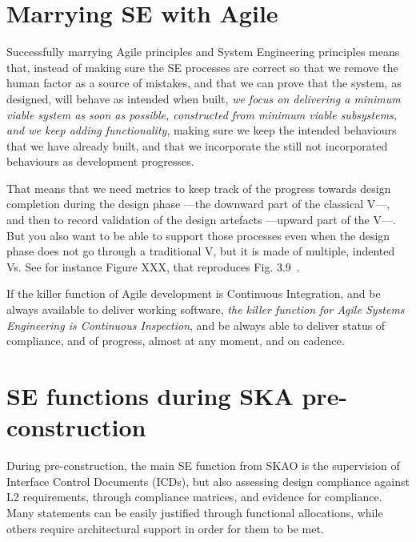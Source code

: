 \documentclass[11pt,twoside]{article}
\begin{document}

\section{Marrying SE with Agile} %
\label{sec:se_and_agile}
Successfully marrying Agile principles and System Engineering principles means that, instead of making sure the SE processes are correct so that we remove the human factor as a source of mistakes, and that we can prove that the system, as designed, will behave as intended when built, \emph{we focus on delivering a minimum viable system as soon as possible, constructed from minimum viable subsystems, and we keep adding functionality}, making sure we keep the intended behaviours that we have already built, and that we incorporate the still not incorporated behaviours as development progresses.	

That means that we need metrics to keep track of the progress towards design completion during the design phase ---the downward part of the classical V---, and then to record validation of the design artefacts ---upward part of the V---. But you also want to be able to support those processes even when the design phase does not go through a traditional V, but it is made of multiple, indented Vs. See for instance Figure XXX, that reproduces Fig. 3.9~\citep{INCOSE-TP-2003-002-04}.

If the killer function of Agile development is Continuous Integration, and be always available to deliver working software, \emph{the killer function for Agile Systems Engineering is Continuous Inspection}, and be always able to deliver status of compliance, and of progress, almost at any moment, and on cadence.	


\section{SE functions during SKA pre-construction} %
\label{sec:se_functions_during_ska_pre_construction}
During pre-construction, the main SE function from SKAO is the supervision of Interface Control Documents (ICDs), but also assessing design compliance against L2 requirements, through compliance matrices, and evidence for compliance. Many statements can be easily justified through functional allocations, while others require architectural support in order for them to be met.
\end{document}

